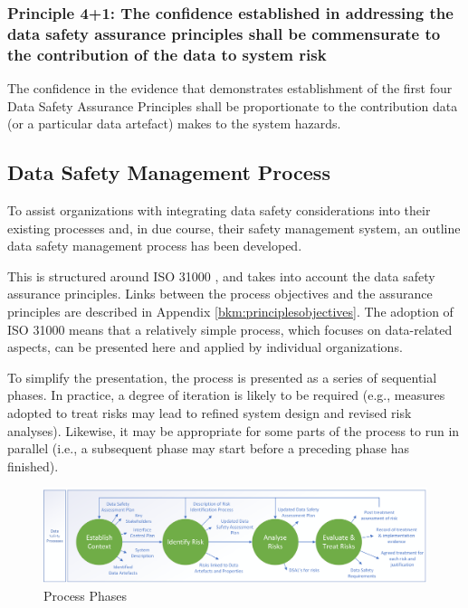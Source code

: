 \subsubsection{Principle 4+1: The confidence established in addressing the data safety assurance principles shall be commensurate to the contribution of the data to system risk}
The confidence in the evidence that demonstrates establishment of the first four Data Safety Assurance Principles shall be proportionate to the contribution data (or a particular \gls{data artefact}) makes to the system hazards.

\cbstart\subsection{Data Safety Management Process}
To assist organizations with integrating data safety considerations into their existing processes and,
in due course, their safety management system, an outline data safety management process has
been developed.

This is structured around ISO 31000 \cite{citation:iso310002018risk}, and takes into account the data safety assurance principles.
Links between the process objectives and the assurance principles are described in Appendix \ref{bkm:principlesobjectives}. The
adoption of ISO 31000 means that a relatively simple process, which focuses on data-related
aspects, can be presented here and applied by individual organizations.

To simplify the presentation, the process is presented as a series of sequential phases. In practice, a
degree of iteration is likely to be required (e.g., measures adopted to \gls{treat} risks may lead to refined
system design and revised risk analyses). Likewise, it may be appropriate for some parts of the
process to run in parallel (i.e., a subsequent phase may start before a preceding phase has finished).
\begin{figure}[h]
\centering
\includegraphics[scale=0.45]{images/process diagram v3 Data Safety Only}
\caption{Process Phases}
\label{fig:process_phases}
\end{figure}

